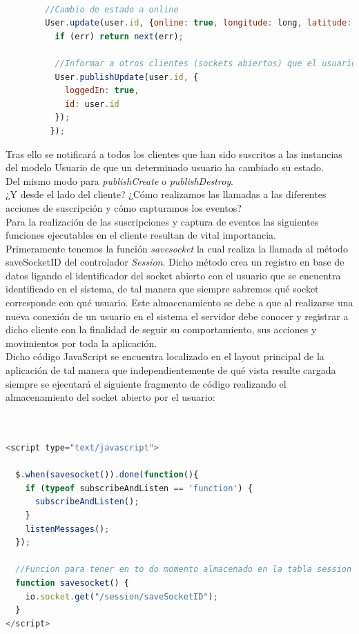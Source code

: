 \begin{lstlisting}[language=JavaScript]

        //Cambio de estado a online
        User.update(user.id, {online: true, longitude: long, latitude: lat}, function (err){
          if (err) return next(err);

          //Informar a otros clientes (sockets abiertos) que el usuario esta logueado
          User.publishUpdate(user.id, {
            loggedIn: true,
            id: user.id
          });
         });

\end{lstlisting}

Tras ello se notificará a todos los clientes que han sido suscritos a las instancias del modelo Usuario de que un determinado usuario ha cambiado su estado.\\



Del mismo modo para \emph{publishCreate} o \emph{publishDestroy}.\\


¿Y desde el lado del cliente? ¿Cómo realizamos las llamadas a las diferentes acciones de suscripción y cómo capturamos los eventos?\\

Para la realización de las suscripciones y captura de eventos las siguientes funciones ejecutables en el cliente resultan de vital importancia.\\

Primeramente tenemos la función \emph{savesocket} la cual realiza la llamada al método saveSocketID del controlador \emph{Session}. Dicho método crea un registro en base de datos ligando el
identificador del socket abierto con el usuario que se encuentra identificado en el sistema, de tal manera que siempre sabremos qué socket corresponde con qué usuario. Este almacenamiento se debe
a que al realizarse una nueva conexión de un usuario en el sistema el servidor debe conocer y registrar a dicho cliente con la finalidad de seguir su comportamiento, sus acciones y movimientos por toda
la aplicación.\\

Dicho código JavaScript se encuentra localizado en el layout principal de la aplicación de tal manera que independientemente de qué vista resulte cargada siempre se ejecutará el siguiente fragmento
de código realizando el almacenamiento del socket abierto por el usuario:\\

\begin{lstlisting}[language=JavaScript]


<script type="text/javascript">

  $.when(savesocket()).done(function(){
    if (typeof subscribeAndListen == 'function') {
      subscribeAndListen();
    }
    listenMessages();
  });

  //Funcion para tener en to do momento almacenado en la tabla session los sockets conectados junto con el usuario al que pertenece
  function savesocket() {
    io.socket.get("/session/saveSocketID");
  }
</script>

\end{lstlisting}


